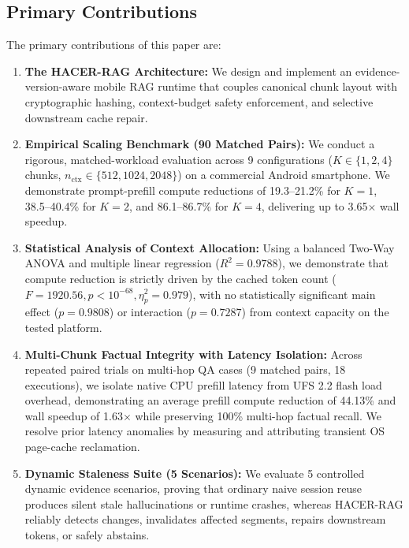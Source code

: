 \subsection{Primary Contributions}
The primary contributions of this paper are:
\begin{enumerate}
    \item \textbf{The HACER-RAG Architecture:} We design and implement an evidence-version-aware mobile RAG runtime that couples canonical chunk layout with cryptographic hashing, context-budget safety enforcement, and selective downstream cache repair.
    \item \textbf{Empirical Scaling Benchmark (90 Matched Pairs):} We conduct a rigorous, matched-workload evaluation across 9 configurations ($K \in \{1, 2, 4\}$ chunks, $n_{\text{ctx}} \in \{512, 1024, 2048\}$) on a commercial Android smartphone. We demonstrate prompt-prefill compute reductions of 19.3--21.2\% for $K=1$, 38.5--40.4\% for $K=2$, and 86.1--86.7\% for $K=4$, delivering up to 3.65$\times$ wall speedup.
    \item \textbf{Statistical Analysis of Context Allocation:} Using a balanced Two-Way ANOVA and multiple linear regression ($R^2 = 0.9788$), we demonstrate that compute reduction is strictly driven by the cached token count ($F = 1920.56, p < 10^{-68}, \eta_p^2 = 0.979$), with no statistically significant main effect ($p = 0.9808$) or interaction ($p = 0.7287$) from context capacity on the tested platform.
    \item \textbf{Multi-Chunk Factual Integrity with Latency Isolation:} Across repeated paired trials on multi-hop QA cases (9 matched pairs, 18 executions), we isolate native CPU prefill latency from UFS 2.2 flash load overhead, demonstrating an average prefill compute reduction of 44.13\% and wall speedup of 1.63$\times$ while preserving 100\% multi-hop factual recall. We resolve prior latency anomalies by measuring and attributing transient OS page-cache reclamation.
    \item \textbf{Dynamic Staleness Suite (5 Scenarios):} We evaluate 5 controlled dynamic evidence scenarios, proving that ordinary naive session reuse produces silent stale hallucinations or runtime crashes, whereas HACER-RAG reliably detects changes, invalidates affected segments, repairs downstream tokens, or safely abstains.
\end{enumerate}

